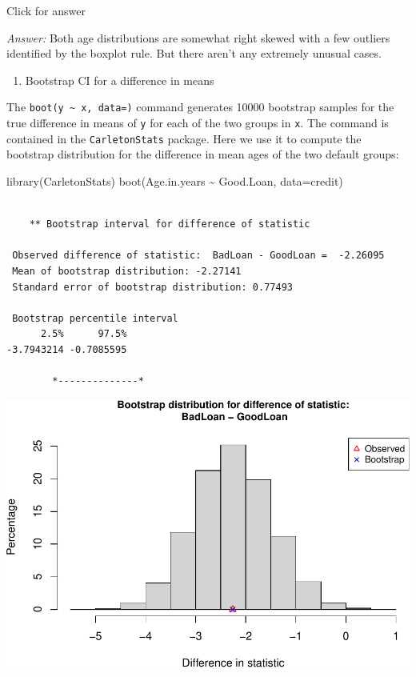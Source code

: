 \documentclass[
]{book}
\newenvironment{Shaded}{\begin{snugshade}}{\end{snugshade}}
\newcommand{\AttributeTok}[1]{\textcolor[rgb]{0.77,0.63,0.00}{#1}}
\newcommand{\FunctionTok}[1]{\textcolor[rgb]{0.00,0.00,0.00}{#1}}
\newcommand{\NormalTok}[1]{#1}
\newcommand{\SpecialCharTok}[1]{\textcolor[rgb]{0.00,0.00,0.00}{#1}}
\providecommand{\tightlist}{%
  \setlength{\itemsep}{0pt}\setlength{\parskip}{0pt}}
\begin{document}
Click for answer

\emph{Answer:} Both age distributions are somewhat right skewed with a few outliers identified by the boxplot rule. But there aren't any extremely unusual cases.

\begin{enumerate}
\def\labelenumi{(\alph{enumi})}
\setcounter{enumi}{1}
\tightlist
\item
  Bootstrap CI for a difference in means
\end{enumerate}

The \texttt{boot(y\ \textasciitilde{}\ x,\ data=)} command generates 10000 bootstrap samples for the true difference in means of \texttt{y} for each of the two groups in \texttt{x}. The command is contained in the \texttt{CarletonStats} package. Here we use it to compute the bootstrap distribution for the difference in mean ages of the two default groups:

\begin{Shaded}
\begin{Highlighting}[]
\FunctionTok{library}\NormalTok{(CarletonStats)}
\FunctionTok{boot}\NormalTok{(Age.in.years }\SpecialCharTok{\textasciitilde{}}\NormalTok{ Good.Loan, }\AttributeTok{data=}\NormalTok{credit)}
\end{Highlighting}
\end{Shaded}

\begin{verbatim}

    ** Bootstrap interval for difference of statistic

 Observed difference of statistic:  BadLoan - GoodLoan =  -2.26095 
 Mean of bootstrap distribution: -2.27141 
 Standard error of bootstrap distribution: 0.77493 

 Bootstrap percentile interval
      2.5%      97.5% 
-3.7943214 -0.7085595 

        *--------------*
\end{verbatim}

\includegraphics[width=1\linewidth]{Class_Activity_8_files/figure-latex/unnamed-chunk-10-1}
\end{document}
